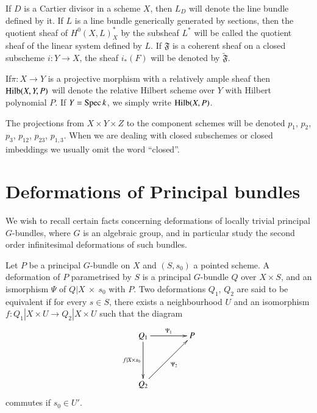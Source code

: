If $D$ is a Cartier divisor in a scheme $X$, then $L_{D}$ will denote
the line bundle defined by it. If $L$ is a line bundle generically
generated by sections, then the quotient sheaf of $H^{0}(X,L)^{*}_{X}$
by the subsheaf $L^{*}$ will be called the quotient sheaf of the
linear system defined by $L$. If $\mathfrak{F}$ is a coherent sheaf on
a closed subscheme $i:Y\to X$, the sheaf $i_{*}(F)$ will be denoted by
$\widetilde{\mathfrak{F}}$. 

If\pageoriginale $\pi:X\to Y$ is a projective morphism with a relatively ample sheaf
then $\operatorname{Hilb}(X,Y,P)$ will denote the relative Hilbert scheme over $Y$
with Hilbert polynomial $P$. If $Y=\operatorname{Spec} k$, we simply write
$\operatorname{Hilb}(X,P)$.

The projections from $X\times Y\times Z$ to the component schemes will
be denoted $p_{1}$, $p_{2}$, $p_{3}$, $p_{12}$, $p_{23}$,
$p_{1,3}$. When we are dealing with closed subschemes or closed
imbeddings we usually omit the word ``closed''.

\section{Deformations of Principal bundles}\label{art05-sec2}

We wish to recall certain facts concerning deformations of locally
trivial principal $G$-bundles, where $G$ is an algebraic group, and in
particular study the second order infinitesimal deformations of such
bundles. 

\begin{definition}\label{art05-defi2.1}
Let $P$ be a principal $G$-bundle on $X$ and $(S,s_{0})$ a pointed
scheme. A deformation of $P$ parametrised by $S$ is a principal
$G$-bundle $Q$ over $X\times S$, and an ismorphism $\Psi$ of
$Q|X~\times~{s_{0}}$ with $P$. Two deformations $Q_{1}$, $Q_{2}$ are
said to be equivalent if for every $s\in S$, there exists a
neighbourhood $U$ and an isomorphism $f:Q_{1}|X\times U\to
Q_{2}|X\times U$ such that the diagram
\[
\xymatrix@=1.5cm{
Q_{1}\ar[r]^-{\Psi_{1}}\ar[d]_-{f|X\times s_{0}} & P\\
Q_{2}\ar[ur]_-{\Psi_{2}} &
}
\]
commutes if $s_{0}\in U'$.
\end{definition}


